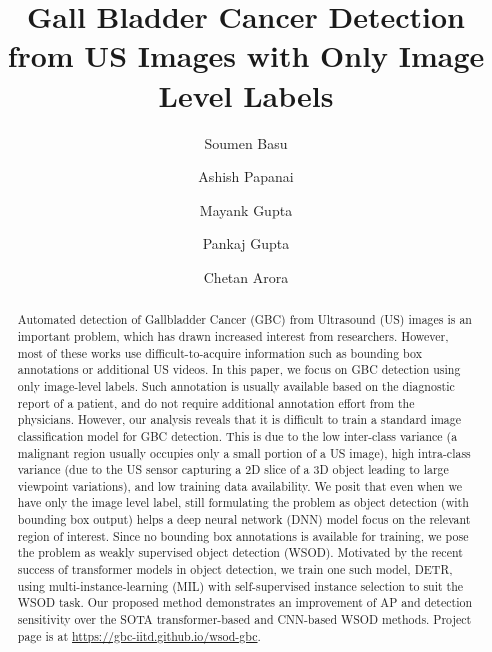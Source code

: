 \documentclass[runningheads]{llncs}
\begin{document}
%
\title{Gall Bladder Cancer Detection from US Images with Only Image Level Labels}
%
%
\author{
    Soumen Basu  \Letter 
    \and
    Ashish Papanai 
    \and
    Mayank Gupta 
    \and
    Pankaj Gupta
    \and
    Chetan Arora 
}

%
%
%
\maketitle              %
%

%
%
\begin{abstract}
%
	Automated detection of Gallbladder Cancer (GBC) from Ultrasound (US) images is an important problem, which has drawn increased interest from researchers. However, most of these works use difficult-to-acquire information such as bounding box annotations or additional US videos. In this paper, we focus on GBC detection using only image-level labels. Such annotation is usually available based on the diagnostic report of a patient, and do not require additional annotation effort from the physicians. However, our analysis reveals that it is difficult to train a standard image classification model for GBC detection. This is due to the low inter-class variance (a malignant region usually occupies only a small portion of a US image), high intra-class variance (due to the US sensor capturing a 2D slice of a 3D object leading to large viewpoint variations), and low training data availability. We posit that even when we have only the image level label, still formulating the problem as object detection (with bounding box output) helps a deep neural network (DNN) model focus on the relevant region of interest. Since no bounding box annotations is available for training, we pose the problem as weakly supervised object detection (WSOD). Motivated by the recent success of transformer models in object detection, we train one such model, DETR, using multi-instance-learning (MIL) with self-supervised instance selection to suit the WSOD task. Our proposed method demonstrates an improvement of AP and detection sensitivity over the SOTA transformer-based and CNN-based WSOD methods. Project page is at \url{https://gbc-iitd.github.io/wsod-gbc}.
 
\end{abstract}
\end{document}
